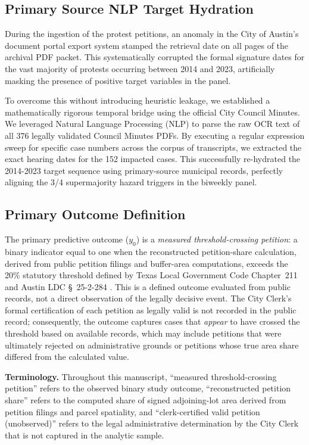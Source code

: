 \documentclass[11pt, letterpaper]{article}
\begin{document}
\subsection{Primary Source NLP Target Hydration}

During the ingestion of the protest petitions, an anomaly in the City of Austin's document portal export system stamped the retrieval date on all pages of the archival PDF packet. This systematically corrupted the formal signature dates for the vast majority of protests occurring between 2014 and 2023, artificially masking the presence of positive target variables in the panel. 

To overcome this without introducing heuristic leakage, we established a mathematically rigorous temporal bridge using the official City Council Minutes. We leveraged Natural Language Processing (NLP) to parse the raw OCR text of all 376 legally validated Council Minutes PDFs. By executing a regular expression sweep for specific case numbers across the corpus of transcripts, we extracted the exact hearing dates for the 152 impacted cases. This successfully re-hydrated the 2014-2023 target sequence using primary-source municipal records, perfectly aligning the 3/4 supermajority hazard triggers in the biweekly panel.

\subsection{Primary Outcome Definition}
\label{sec:outcome}

The primary predictive outcome ($y_0$) is a \emph{measured threshold-crossing petition}: a binary indicator equal to one when the reconstructed petition-share calculation, derived from public petition filings and buffer-area computations, exceeds the 20\% statutory threshold defined by Texas Local Government Code Chapter~211 and Austin LDC \S~25-2-284 \cite{texas211006}. This is a defined outcome evaluated from public records, not a direct observation of the legally decisive event. The City Clerk's formal certification of each petition as legally valid is not recorded in the public record; consequently, the outcome captures cases that \emph{appear} to have crossed the threshold based on available records, which may include petitions that were ultimately rejected on administrative grounds or petitions whose true area share differed from the calculated value.

\textbf{Terminology.} Throughout this manuscript, ``measured threshold-crossing petition'' refers to the observed binary study outcome, ``reconstructed petition share'' refers to the computed share of signed adjoining-lot area derived from petition filings and parcel spatiality, and ``clerk-certified valid petition (unobserved)'' refers to the legal administrative determination by the City Clerk that is not captured in the analytic sample.
\end{document}
